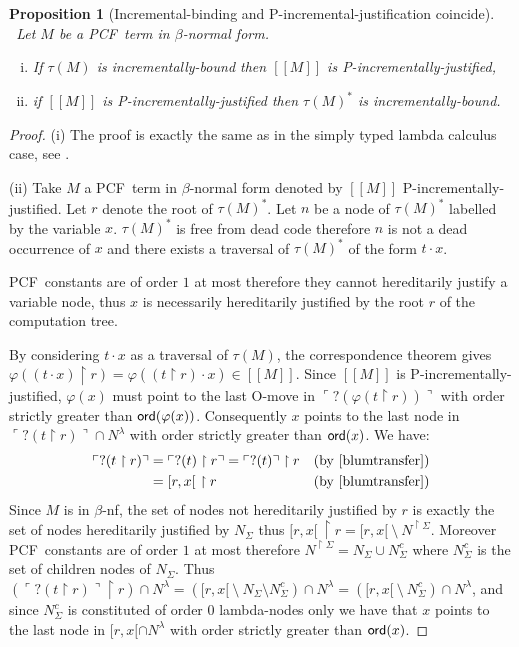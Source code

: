 \documentclass{article}
\newcommand{\sem}[1]{{[\![ #1 ]\!]}}
\newcommand\pcf{\textsf{PCF}}
\newcommand{\pview}[1]{\ulcorner #1 \urcorner}
\newcommand{\ord}[1]{{\sf ord}(#1)}
\newcommand\inter{\cap}
\newcommand\union{\cup}
\newtheorem{proposition}{Proposition}[section]
\theoremstyle{remark}
\theoremstyle{definition}
\begin{document}
\begin{proposition}[Incremental-binding and P-incremental-justification coincide] \
\label{prop:incrbound_imp_incrjustified_pcf} Let $M$ be a \pcf\ term in $\beta$-normal form.
\begin{enumerate}[(i)]
\item  If $\tau(M)$ is incrementally-bound then $\sem{M}$ is P-incrementally-justified,
\item  if $\sem{M}$ is P-incrementally-justified
then $\tau(M)^*$ is incrementally-bound.
\end{enumerate}
\end{proposition}
\begin{proof}
(i) The proof is exactly the same as in the simply typed lambda calculus case,
see \cite[Proposition 4.1.5(i)]{blumtransfer}.

\noindent (ii)
Take $M$ a \pcf\ term in $\beta$-normal form denoted by
$\sem{M}$ P-incrementally-justified. Let $r$ denote the root of $\tau(M)^*$.
Let $n$ be a node of $\tau(M)^*$ labelled by the variable $x$.
$\tau(M)^*$ is free from dead code therefore $n$ is not a dead occurrence of $x$ and there exists a traversal of $\tau(M)^*$ of the form $t \cdot x$.

\pcf\ constants are of order $1$ at most therefore they cannot hereditarily justify a variable node, thus $x$ is necessarily hereditarily justified by the root $r$ of the computation tree.


By considering $t\cdot x$ as a traversal of $\tau(M)$,  the correspondence theorem gives $\varphi((t \cdot x) \upharpoonright r) = \varphi((t \upharpoonright r) \cdot x) \in \sem{M}$. Since $\sem{M}$ is P-incrementally-justified, $\varphi(x)$
must point to the last O-move in $\pview{?(\varphi(t \upharpoonright
r))}$ with order strictly greater than $\ord{\varphi(x)}$.
Consequently $x$ points to the last node in $\pview{?(t
\upharpoonright r)} \inter N^{\lambda}$ with order strictly greater than $\ord{x}$. We have:
\begin{align*}
\pview{?(t \upharpoonright r)} &= \pview{?(t) \upharpoonright r} = \pview{?(t)} \upharpoonright r & (\mbox{by \cite[lemma 3.1.23]{blumtransfer}}) \\
& = [r,x[ \ \upharpoonright r & (\mbox{by \cite[proposition 3.1.20]{blumtransfer}})
\end{align*}
Since $M$ is in $\beta$-nf, the set of nodes
not hereditarily justified by $r$ is exactly the set of nodes hereditarily justified by $N_{\Sigma}$ thus
$[r,x[ \ \upharpoonright r = [r,x[\ \setminus\  N^{\upharpoonright \Sigma}$.
Moreover \pcf\ constants are of order $1$ at most therefore
$N^{\upharpoonright \Sigma} = N_{\Sigma} \union N^c_{\Sigma}$
where $N^c_{\Sigma}$ is the set of children nodes of $N_{\Sigma}$.
Thus $(\pview{?(t \upharpoonright r)}\upharpoonright r) \inter N^{\lambda} =
([r,x[\ \setminus\  N_{\Sigma} \setminus N^c_{\Sigma} ) \inter N^{\lambda} =
([r,x[\ \setminus\  N^c_{\Sigma} )  \inter N^{\lambda}$, and
since $N^c_{\Sigma}$ is constituted of order $0$ lambda-nodes only we have that
$x$ points to the last node in $[r,x[ \inter N^{\lambda}$ with order strictly greater than $\ord{x}$.


\end{proof}
\end{document}
